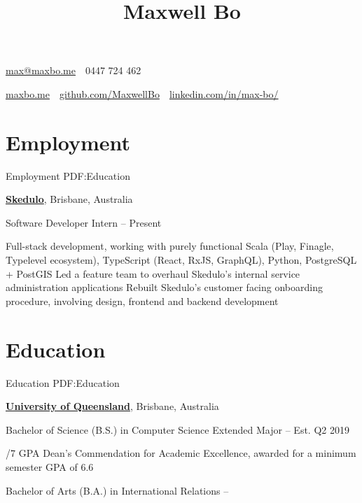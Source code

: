 \documentclass[a4paper,10pt,oneside]{article}
\begin{document}

\title{Maxwell Bo}

\begin{subtitle}
\par \href{mailto:max@maxbo.me}{max@maxbo.me} \,\BulletSymbol\, 0447 724 462

\par \href{http://maxbo.me/}{maxbo.me} 
\,\BulletSymbol\, 
\href{https://github.com/MaxwellBo}{github.com/MaxwellBo}
\,\BulletSymbol\, 
\href{https://www.linkedin.com/in/max-bo/}{linkedin.com/in/max-bo/}

\end{subtitle}

\begin{body}


\section
{Employment}
{Employment}
{PDF:Education}

\href{https://skedulo.com/}{\textbf{Skedulo}}, Brisbane, Australia
\par Software Developer Intern\hfill {} -- Present 
\begin{detail}
	\BulletItem Full-stack development, working with purely functional Scala (Play, Finagle, Typelevel ecosystem),\newline
	TypeScript (React, RxJS, GraphQL), Python, PostgreSQL + PostGIS
	\BulletItem Led a feature team to overhaul Skedulo's internal service administration applications
	\BulletItem Rebuilt Skedulo's customer facing onboarding procedure, involving design, frontend and backend development
\end{detail}


\section
{Education}
{Education}
{PDF:Education}

\href{https://www.uq.edu.au/}{\textbf{University of Queensland}}, Brisbane, Australia
\par Bachelor of Science (B.S.) in Computer Science Extended Major\hfill {} -- Est. Q2 2019
\begin{detail}
/7 GPA
\BulletItem Dean's Commendation for Academic Excellence, awarded for a minimum semester GPA of 6.6 \hfill {}
\end{detail}
\par Bachelor of Arts (B.A.) in International Relations\hfill {} -- 
\begin{detail}
\end{detail}


\end{body}
\end{document}
